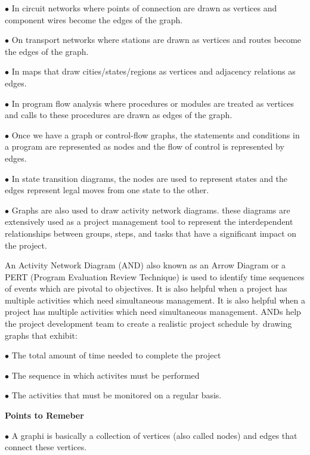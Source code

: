 \vskip 3mm
\qquad$\bullet$ In circuit networks where points of connection are drawn as vertices and component wires become the edges of the graph.

\vskip 3mm
\qquad$\bullet$ On transport networks where stations are drawn as vertices and routes become the edges of the graph.

\vskip 3mm
\qquad$\bullet$ In maps that draw cities/states/regions as vertices and adjacency relations as edges.

\vskip 3mm
\qquad$\bullet$ In program flow analysis where procedures or modules are treated as vertices and calls to these procedures are drawn as edges of the graph.

\vskip 3mm
\qquad$\bullet$ Once we have a graph or control-flow graphs, the statements and conditions in a program are represented as nodes and the flow of control is represented by edges.

\vskip 3mm
\qquad$\bullet$ In state transition diagrams, the nodes are used to represent states and the edges represent legal moves from one state to the other.

\vskip 3mm
\qquad$\bullet$ Graphs are also used to draw activity network diagrams. these diagrams are extensively used as a project management tool to represent the interdependent relationships between groups, steps, and tasks that have a significant impact on the project.

\vskip 1mm
An Activity Network Diagram (AND) also known as an Arrow Diagram or a PERT (Program Evaluation Review Technique) is used to identify time sequences of events which are pivotal  to objectives. It is also helpful when a project has multiple activities which need simultaneous management. It is also helpful when a project has multiple activities which need simultaneous management. ANDs help the project development team to create a realistic project schedule by drawing graphs that exhibit:

\vskip 3mm
\qquad$\bullet$ The total amount of time needed to complete the project

\vskip 3mm
\qquad$\bullet$ The sequence in which activites must be performed

\vskip 3mm
\qquad$\bullet$ The activities that must be monitored on a regular basis.

\filbreak
\vskip 1cm
{\bf Points to Remeber}

\vskip 3mm
\qquad$\bullet$ A graphi is basically a collection of vertices (also called nodes) and edges that connect these vertices.

